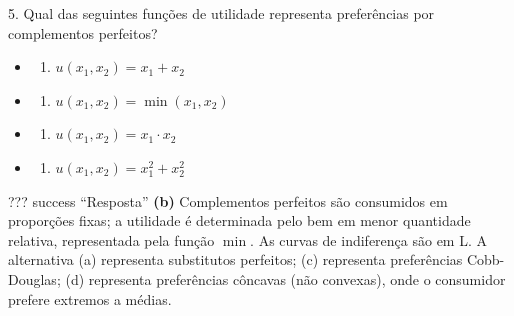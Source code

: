 \documentclass[11pt,twoside,openright]{book}
\providecommand{\tightlist}{\setlength{\itemsep}{0pt}\setlength{\parskip}{0pt}}
\begin{document}
\begin{infobox}{5. Qual das seguintes funções de utilidade representa preferências por complementos perfeitos?}

\begin{itemize}
\tightlist
\item
  \begin{enumerate}
  \def\labelenumi{(\alph{enumi})}
  \tightlist
  \item
    \(u(x_1, x_2) = x_1 + x_2\)
  \end{enumerate}
\item
  \begin{enumerate}
  \def\labelenumi{(\alph{enumi})}
  \setcounter{enumi}{1}
  \tightlist
  \item
    \(u(x_1, x_2) = \min(x_1, x_2)\)
  \end{enumerate}
\item
  \begin{enumerate}
  \def\labelenumi{(\alph{enumi})}
  \setcounter{enumi}{2}
  \tightlist
  \item
    \(u(x_1, x_2) = x_1 \cdot x_2\)
  \end{enumerate}
\item
  \begin{enumerate}
  \def\labelenumi{(\alph{enumi})}
  \setcounter{enumi}{3}
  \tightlist
  \item
    \(u(x_1, x_2) = x_1^2 + x_2^2\)
  \end{enumerate}
\end{itemize}

??? success ``Resposta'' \textbf{(b)} Complementos perfeitos são
consumidos em proporções fixas; a utilidade é determinada pelo bem em
menor quantidade relativa, representada pela função \(\min\). As curvas
de indiferença são em L. A alternativa (a) representa substitutos
perfeitos; (c) representa preferências Cobb-Douglas; (d) representa
preferências côncavas (não convexas), onde o consumidor prefere extremos
a médias.

\end{infobox}
\end{document}
